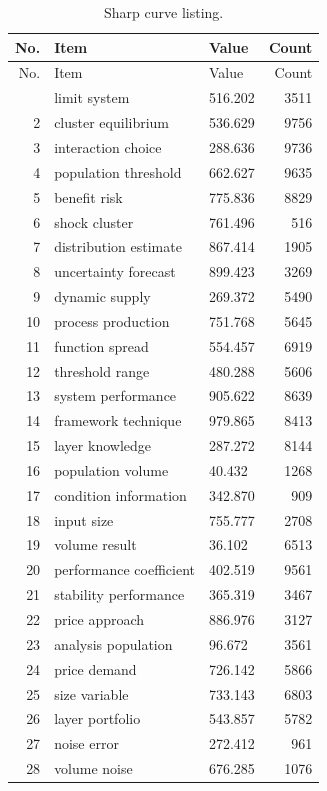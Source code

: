 \documentclass[11pt]{report}
\begin{document}
\begin{longtable}{rllr}\caption{Sharp curve listing.}\label{tab:l4}\\\toprule No. & Item & Value & Count \\ \midrule \endfirsthead\toprule No. & Item & Value & Count \\ \midrule \endhead\bottomrule \endfoot
1 & limit system & 516.202 & 3511 \\
2 & cluster equilibrium & 536.629 & 9756 \\
3 & interaction choice & 288.636 & 9736 \\
4 & population threshold & 662.627 & 9635 \\
5 & benefit risk & 775.836 & 8829 \\
6 & shock cluster & 761.496 & 516 \\
7 & distribution estimate & 867.414 & 1905 \\
8 & uncertainty forecast & 899.423 & 3269 \\
9 & dynamic supply & 269.372 & 5490 \\
10 & process production & 751.768 & 5645 \\
11 & function spread & 554.457 & 6919 \\
12 & threshold range & 480.288 & 5606 \\
13 & system performance & 905.622 & 8639 \\
14 & framework technique & 979.865 & 8413 \\
15 & layer knowledge & 287.272 & 8144 \\
16 & population volume & 40.432 & 1268 \\
17 & condition information & 342.870 & 909 \\
18 & input size & 755.777 & 2708 \\
19 & volume result & 36.102 & 6513 \\
20 & performance coefficient & 402.519 & 9561 \\
21 & stability performance & 365.319 & 3467 \\
22 & price approach & 886.976 & 3127 \\
23 & analysis population & 96.672 & 3561 \\
24 & price demand & 726.142 & 5866 \\
25 & size variable & 733.143 & 6803 \\
26 & layer portfolio & 543.857 & 5782 \\
27 & noise error & 272.412 & 961 \\
28 & volume noise & 676.285 & 1076 \\

\end{longtable}
\end{document}
